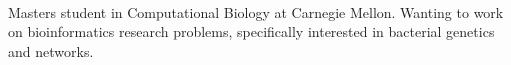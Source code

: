 \begin{cvparagraph}\\
Masters student in Computational Biology at Carnegie Mellon.
Wanting to work on bioinformatics research problems, specifically interested in bacterial genetics and networks.
\end{cvparagraph}
